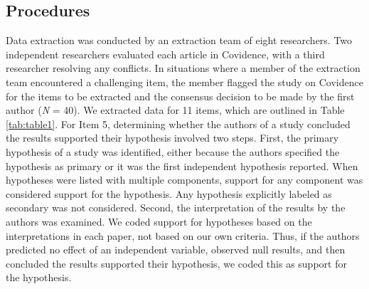 \documentclass[
  man, donotrepeattitle,mask,floatsintext]{apa7}
\begin{document}
\pagebreak

\hypertarget{procedures}{%
\subsection{Procedures}\label{procedures}}

Data extraction was conducted by an extraction team of eight researchers. Two independent researchers evaluated each article in Covidence, with a third researcher resolving any conflicts. In situations where a member of the extraction team encountered a challenging item, the member flagged the study on Covidence for the items to be extracted and the consensus decision to be made by the first author (\emph{N} = 40). We extracted data for 11 items, which are outlined in Table \ref{tab:table1}. For Item 5, determining whether the authors of a study concluded the results supported their hypothesis involved two steps. First, the primary hypothesis of a study was identified, either because the authors specified the hypothesis as primary or it was the first independent hypothesis reported. When hypotheses were listed with multiple components, support for any component was considered support for the hypothesis. Any hypothesis explicitly labeled as secondary was not considered. Second, the interpretation of the results by the authors was examined. We coded support for hypotheses based on the interpretations in each paper, not based on our own criteria. Thus, if the authors predicted no effect of an independent variable, observed null results, and then concluded the results supported their hypothesis, we coded this as support for the hypothesis.
\end{document}
